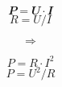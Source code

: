 \documentclass[varwidth]{standalone}
\begin{document}
\begin{minipage}{2cm}
$$\mathbfit{ P = U · I }$$
$$ R = U / I$$
\end{minipage}
\begin{minipage}{1cm}
$$\Rightarrow$$
\end{minipage}
\begin{minipage}{2cm}
$$P = R · I^2$$
$$P = U^2 / R$$
\end{minipage}
\end{document}
